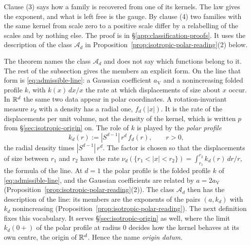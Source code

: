 Clause (3) says how a family is
recovered from one of its kernels. The law gives the exponent, and what is left free is the
gauge. By clause (4) two families with the same kernel from scale zero to a positive scale
differ by a relabelling of the scales and by nothing else. The proof is in \S\ref{app:classification-proofs}. It uses the
description of the class $\mathcal{A}_d$ in
Proposition~\ref{prop:isotropic-polar-reading}(2) below.

The theorem names the class $\mathcal{A}_d$ and does not say which functions belong to it. The
rest of the subsection gives the members an explicit form. On the line that form is
\ref{eq:admissible-line}: a Gaussian coefficient $a_{\mathrm V}$ and a nonincreasing folded
profile $k$, with $k(x)\,dx/x$ the rate at which displacements of size about $x$ occur. In
$\mathbb{R}^d$ the same two data appear in polar coordinates.
A rotation-invariant \Levy{} measure $\nu_d$ with a density has a radial one, $f_d(|x|)$. It is
the rate of the displacements per unit volume, not the density of the kernel, which is written
$p$ from \S\ref{sec:isotropic-origin} on. The role of $k$ is played by the \emph{polar profile}
\[
  k_d(r) := |S^{d-1}|\,r^d\,f_d(r) , \qquad r > 0 ,
\]
the radial density times $|S^{d-1}|\,r^d$. The factor is chosen so that the displacements of size
between $r_1$ and $r_2$ have the rate $\nu_d(\{r_1 < |x| < r_2\}) = \int_{r_1}^{r_2} k_d(r)\,dr/r$,
the formula of the line. At $d = 1$ the polar profile is the folded profile $k$ of
\ref{eq:admissible-line}, and the Gaussian coefficients are related by $a = 2a_{\mathrm V}$
(Proposition~\ref{prop:isotropic-polar-reading}(2)). The class $\mathcal{A}_d$ then has the
description of the line: its members are the exponents of the pairs $(a, k_d)$ with $k_d$
nonincreasing (Proposition~\ref{prop:isotropic-polar-reading}). The next definition fixes this
vocabulary. It serves \S\ref{sec:isotropic-origin} as well, where the limit $k_d(0{+})$ of the
polar profile at radius $0$ decides how the kernel behaves at its own centre, the origin of
$\mathbb{R}^d$. Hence the name \emph{origin datum}.

